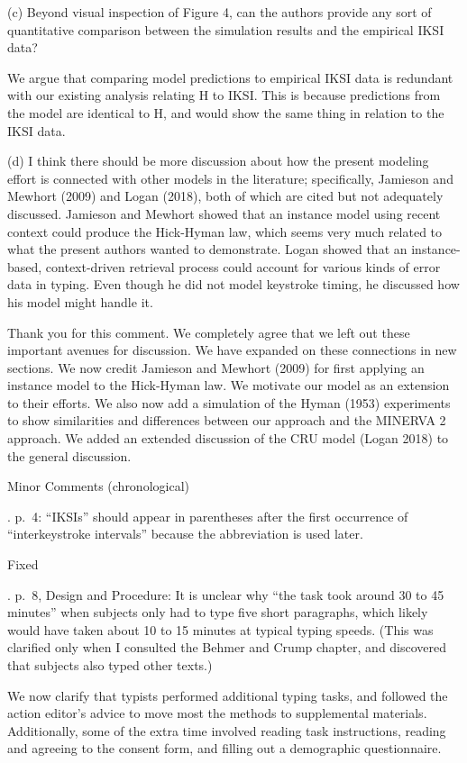 \documentclass[draft]{article}
\begin{document}
\RC (c) Beyond visual inspection of Figure 4, can the authors provide any sort of quantitative comparison between the simulation results and the empirical IKSI data?

We argue that comparing model predictions to empirical IKSI data is redundant with our existing analysis relating H to IKSI. This is because predictions from the model are identical to H, and would show the same thing in relation to the IKSI data.

\RC (d) I think there should be more discussion about how the present modeling effort is connected with other models in the literature; specifically, Jamieson and Mewhort (2009) and Logan (2018), both of which are cited but not adequately discussed. Jamieson and Mewhort showed that an instance model using recent context could produce the Hick-Hyman law, which seems very much related to what the present authors wanted to demonstrate. Logan showed that an instance-based, context-driven retrieval process could account for various kinds of error data in typing. Even though he did not model keystroke timing, he discussed how his model might handle it.

Thank you for this comment. We completely agree that we left out these important avenues for discussion. We have expanded on these connections in new sections. We now credit Jamieson and Mewhort (2009) for first applying an instance model to the Hick-Hyman law. We motivate our model as an extension to their efforts. We also now add a simulation of the Hyman (1953) experiments to show similarities and differences between our approach and the MINERVA 2 approach. We added an extended discussion of the CRU model (Logan 2018) to the general discussion.

Minor Comments (chronological)

. p.~4: ``IKSIs'' should appear in parentheses after the first occurrence of ``interkeystroke intervals'' because the abbreviation is used later.

Fixed

. p.~8, Design and Procedure: It is unclear why ``the task took around 30 to 45 minutes'' when subjects only had to type five short paragraphs, which likely would have taken about 10 to 15 minutes at typical typing speeds. (This was clarified only when I consulted the Behmer and Crump chapter, and discovered that subjects also typed other texts.)

We now clarify that typists performed additional typing tasks, and followed the action editor's advice to move most the methods to supplemental materials. Additionally, some of the extra time involved reading task instructions, reading and agreeing to the consent form, and filling out a demographic questionnaire.
\end{document}
